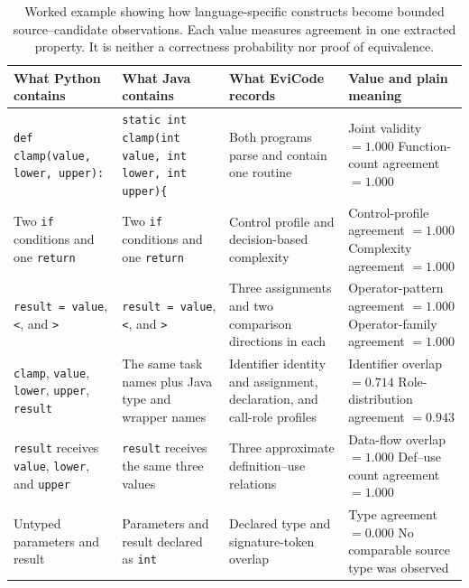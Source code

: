 \documentclass[conference]{IEEEtran}
\begin{document}
\begin{table}[t]
\centering
\caption{Worked example showing how language-specific constructs become bounded source--candidate observations. Each value measures agreement in one extracted property. It is neither a correctness probability nor proof of equivalence.}
\label{tab:normalized-example}
\small
\setlength{\tabcolsep}{5pt}
\begin{tabular}{@{}>{\raggedright\arraybackslash}p{}>{\raggedright\arraybackslash}p{}>{\raggedright\arraybackslash}p{}>{\raggedright\arraybackslash}p{}@{}}
\toprule
What Python contains & What Java contains & What EviCode records & Value and plain meaning \\
\midrule
\texttt{def clamp(value, lower, upper):} & \texttt{static int clamp(int value, int lower, int upper)\{} & Both programs parse and contain one routine & Joint validity $=1.000$ \newline Function-count agreement $=1.000$ \\
Two \texttt{if} conditions and one \texttt{return} & Two \texttt{if} conditions and one \texttt{return} & Control profile and decision-based complexity & Control-profile agreement $=1.000$ \newline Complexity agreement $=1.000$ \\
\texttt{result = value}, \texttt{<}, and \texttt{>} & \texttt{result = value}, \texttt{<}, and \texttt{>} & Three assignments and two comparison directions in each & Operator-pattern agreement $=1.000$ \newline Operator-family agreement $=1.000$ \\
\texttt{clamp}, \texttt{value}, \texttt{lower}, \texttt{upper}, \texttt{result} & The same task names plus Java type and wrapper names & Identifier identity and assignment, declaration, and call-role profiles & Identifier overlap $=0.714$ \newline Role-distribution agreement $=0.943$ \\
\texttt{result} receives \texttt{value}, \texttt{lower}, and \texttt{upper} & \texttt{result} receives the same three values & Three approximate definition--use relations & Data-flow overlap $=1.000$ \newline Def--use count agreement $=1.000$ \\
Untyped parameters and result & Parameters and result declared as \texttt{int} & Declared type and signature-token overlap & Type agreement $=0.000$ \newline No comparable source type was observed \\
\bottomrule
\end{tabular}
\end{table}
\end{document}
